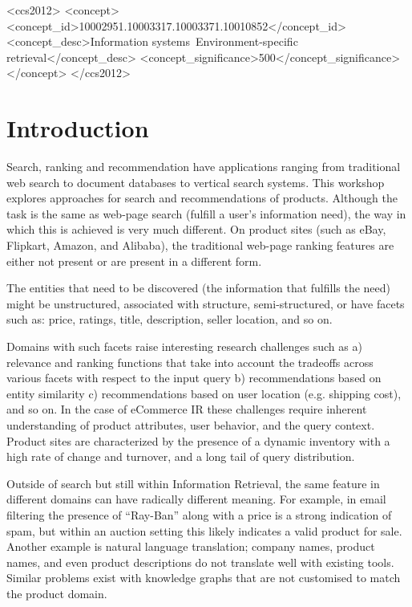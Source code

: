 \documentclass[sigconf]{acmart}
\begin{document}
\begin{CCSXML}
<ccs2012>
<concept>
<concept_id>10002951.10003317.10003371.10010852</concept_id>
<concept_desc>Information systems~Environment-specific retrieval</concept_desc>
<concept_significance>500</concept_significance>
</concept>
</ccs2012>
\end{CCSXML}




\maketitle

\section{Introduction}

Search, ranking and recommendation have applications ranging from
traditional web search to document databases to vertical search systems.
This workshop explores approaches for search and
recommendations of products.  Although the task is the same as web-page
search (fulfill a user's information need), the way in which this is
achieved is very much different.  On product sites (such as eBay, Flipkart,
Amazon, and Alibaba), the traditional web-page ranking features are either
not present or are present in a different form.

The entities that need to be discovered (the information that fulfills
the need) might be unstructured, associated
with structure, semi-structured, or have facets such as: price,
ratings, title, description, seller location, and so on. 

Domains with such facets raise interesting research challenges such as
a) relevance and ranking functions that take into account the tradeoffs
across various facets with respect to the input query b) recommendations
based on entity similarity c) recommendations based on user location
(e.g. shipping cost), and so on. In the case of eCommerce IR
these challenges require inherent
understanding of product attributes, user behavior, and the query
context. Product sites are characterized by the presence of a dynamic
inventory with a high rate of change and turnover, and a long tail of
query distribution.

Outside of search but still within Information Retrieval, the same
feature in different domains can have radically different meaning.  For
example, in email filtering the presence of ``Ray-Ban''  along with a
price is a strong indication of spam, but within an auction setting
this likely indicates a valid product for sale.  Another example is
natural language translation; company names, product names, and even
product descriptions do not translate well with existing tools.  Similar
problems exist with knowledge graphs that are not customised to match
the product domain.
\end{document}
